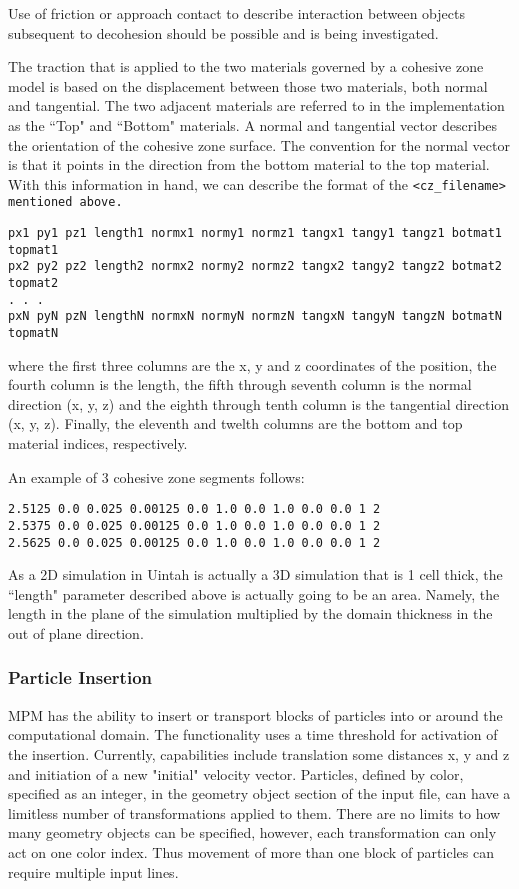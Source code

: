 Use of friction or approach contact to describe interaction between objects
subsequent to decohesion should be possible and is being investigated.

The traction that is applied to the two materials governed by a
cohesive zone model is based on the displacement between those two materials,
both normal and tangential.  The two adjacent materials are referred to in the
implementation as the ``Top" and ``Bottom" materials.  A normal and tangential
vector describes the orientation of the cohesive zone surface.  The convention
for the normal vector is that it points in the direction from the bottom
material to the top material.  With this information in hand, we can describe
the format of the \tt <cz\_filename> \normalfont mentioned above.

\begin{Verbatim}
px1 py1 pz1 length1 normx1 normy1 normz1 tangx1 tangy1 tangz1 botmat1 topmat1
px2 py2 pz2 length2 normx2 normy2 normz2 tangx2 tangy2 tangz2 botmat2 topmat2
. . .
pxN pyN pzN lengthN normxN normyN normzN tangxN tangyN tangzN botmatN topmatN
\end{Verbatim}

where the first three columns are the x, y and z coordinates of the position, 
the fourth column is the length, the fifth through seventh column is the normal
direction (x, y, z) and the eighth through tenth column is the tangential
direction (x, y, z).  Finally, the eleventh and twelth columns are the bottom
and top material indices, respectively.

An example of 3 cohesive zone segments follows:

\begin{Verbatim}
2.5125 0.0 0.025 0.00125 0.0 1.0 0.0 1.0 0.0 0.0 1 2
2.5375 0.0 0.025 0.00125 0.0 1.0 0.0 1.0 0.0 0.0 1 2
2.5625 0.0 0.025 0.00125 0.0 1.0 0.0 1.0 0.0 0.0 1 2
\end{Verbatim}

As a 2D simulation in Uintah is actually a 3D simulation that is 1 cell thick,
the ``length" parameter described above is actually going to be an area.
Namely, the length in the plane of the simulation multiplied by the domain
thickness in the out of plane direction.

\subsubsection{Particle Insertion} \label{Sec:ParticleInsert}
MPM has the ability to insert or transport blocks of particles into or
 around the computational domain.  The functionality uses a time threshold for 
activation of the insertion. Currently, capabilities include translation some 
distances x, y and z and initiation of a new "initial" velocity vector.  Particles, 
defined by color, specified as an integer, in the geometry object section of the 
input file, can have a limitless number of transformations applied to them.  
There are no limits to how many geometry objects can be specified, however,
each transformation can only act on one color index.  Thus movement of more than
one block of particles can require multiple input lines.
 
